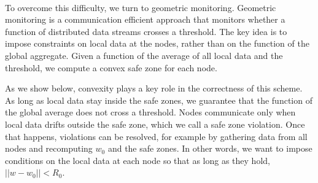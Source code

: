 \documentclass[11pt,twocolumn,varwidth=true,a4paper,fleqn]{article}
\begin{document}
\\\par To overcome this difficulty, we turn to geometric monitoring. Geometric
monitoring \cite{keren2014geometric, keren2012shape} is a communication
efficient approach that monitors whether a function of distributed
data streams crosses a threshold. The key idea is to
impose constraints on local data at the nodes, rather than
on the function of the global aggregate. Given a function of
the average of all local data and the threshold, we compute a
convex safe zone for each node. 
\\\par As we show below, convexity
plays a key role in the correctness of this scheme. As long
as local data stay inside the safe zones, we guarantee that
the function of the global average does not cross a threshold.
Nodes communicate only when local data drifts outside the
safe zone, which we call a safe zone violation. Once that
happens, violations can be resolved, for example by gathering
data from all nodes and recomputing $w_0$ and the safe zones.
In other words, we want to impose conditions on the local
data at each node so that as long as they hold, $||w-w_0||<R_0$.
\end{document}

